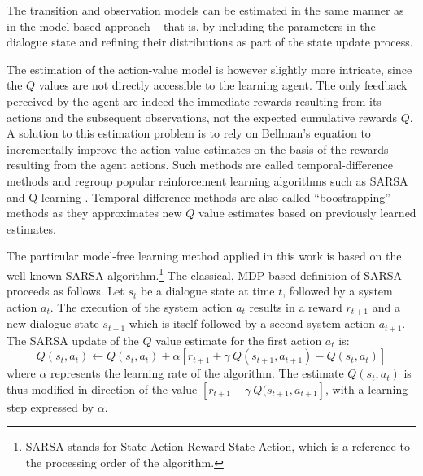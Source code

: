 The transition and observation models can be estimated in the same manner as in the model-based approach -- that is, by including the parameters in the dialogue state and refining their distributions as part of the state update process. 

The estimation of the action-value model is however slightly more intricate, since the $Q$ values are not directly accessible to the learning agent.  The only feedback perceived by the agent are indeed the immediate rewards resulting from its actions and the subsequent observations, not the expected cumulative rewards $Q$.  A solution to this estimation problem is to rely on Bellman's equation to incrementally improve the action-value estimates on the basis of the rewards resulting from the agent actions. Such methods are called temporal-difference methods and regroup popular reinforcement learning algorithms such as SARSA and Q-learning \citep{citeulike:112017}. Temporal-difference methods are also called ``boostrapping'' methods as they approximates new $Q$ value estimates based on previously learned estimates.

The particular model-free learning method applied in this work is based on the well-known SARSA algorithm.\footnote{SARSA stands for State-Action-Reward-State-Action, which is a reference to the processing order of the algorithm.} The classical, MDP-based definition of SARSA proceeds as follows. Let $s_t$ be a dialogue state at time $t$, followed by a system action $a_t$. The execution of the system action $a_t$ results in a reward $r_{t+1}$ and a new dialogue state $s_{t+1}$ which is itself followed by a second system action $a_{t+1}$.  The SARSA update of the $Q$ value estimate for the first action $a_t$ is:
\begin{equation}
Q(s_t, a_t) \leftarrow Q(s_t,a_t) + \alpha \left[r_{t+1} + \gamma \ Q(s_{t+1}, a_{t+1}) - Q(s_t, a_t) \right] 
\end{equation}
where $\alpha$ represents the learning rate of the algorithm. The estimate $Q(s_t, a_t)$ is thus modified in direction of the value $ \left[r_{t+1} + \gamma \ Q(s_{t+1}, a_{t+1} \right]$, with a learning step expressed by $\alpha$. 


